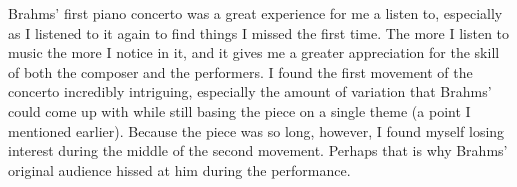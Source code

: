 \documentclass[onecolumn, 12pt]{article}
\begin{document}
Brahms' first piano concerto was a great experience for me a listen to,
especially as I listened to it again to find things I missed the first time.
The more I listen to music the more I notice in it, and it gives me a greater
appreciation for the skill of both the composer and the performers.  I found
the first movement of the concerto incredibly intriguing, especially the amount
of variation that Brahms' could come up with while still basing the piece on a
single theme (a point I mentioned earlier).  Because the piece was so long,
however, I found myself losing interest during the middle of the second
movement.  Perhaps that is why Brahms' original audience hissed at him during
the performance.
\end{document}
